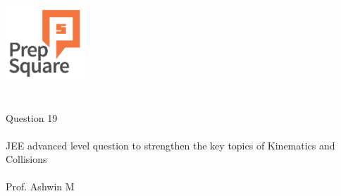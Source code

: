 \documentclass{beamer}
\begin{document}
\begin{center}
\ \\ \ \\
\includegraphics[width=30mm]{Logo-final.png} \\
\ \\ \ \\ 
{\huge Question 19 \\ \ \\ }
{\Large
JEE advanced level question to strengthen the key topics of Kinematics and Collisions
}
{\large \ \\ \ \\ Prof. Ashwin M }
\end{center}
\end{document}
